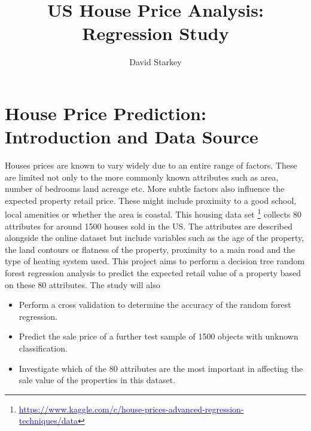 \documentclass[10pt]{article}
\begin{document}
\title{US House Price Analysis: Regression Study}

\author{David Starkey}

\maketitle





\section{House Price Prediction: Introduction and Data Source}



Houses prices are known to vary widely due to an entire range of factors. These are limited not only to the more commonly known attributes such as area, number of bedrooms land acreage etc. More subtle factors also influence the expected property retail price. These might include proximity to a good school, local amenities or whether the area is coastal. This housing data set \footnote{\href{ https://www.kaggle.com/c/house-prices-advanced-regression-techniques/data}{\textcolor{blue}{https://www.kaggle.com/c/house-prices-advanced-regression-techniques/data}}} collects 80 attributes for around 1500 houses sold in the US. The attributes are described alongside the online dataset but include variables such as the age of the property, the land contours or flatness of the property, proximity to a main road and the type of heating system used. This project aims to perform a decision tree random forest regression analysis to predict the expected retail value of a property based on these 80 attributes. The study will also

\begin{itemize}
\item Perform a cross validation to determine the accuracy of the random forest regression.

\item Predict the sale price of a further test sample of 1500 objects with unknown classification.

\item Investigate which of the 80 attributes are the most important in affecting the sale value of the properties in this dataset.

\end{itemize}
\end{document}
